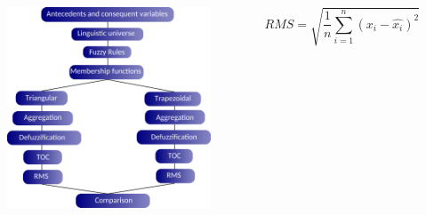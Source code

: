 \documentclass[aspectratio=169]{beamer} %
\begin{document}
{{{{{{ \begin{frame}
	\vspace{1cm}
	\begin{center}
	\begin{large}
	\color{blue}{Methodological flowchart}
	\end{large}
	\end{center}


    \begin{columns}

        \centering
      \begin{figure}
		\centering
		\includegraphics[scale=0.6]{images/methodology.png}
	\end{figure}
	     	\pause
        \centering
\begin{small}
\begin{equation}
RMS = \sqrt{\frac{1}{n}\sum_{i=1}^{n}(x_i - \hat{x_i})^2} \nonumber
\end{equation}
\end{small}
    \end{columns}








\end{frame} }


}}}}}
\end{document}
